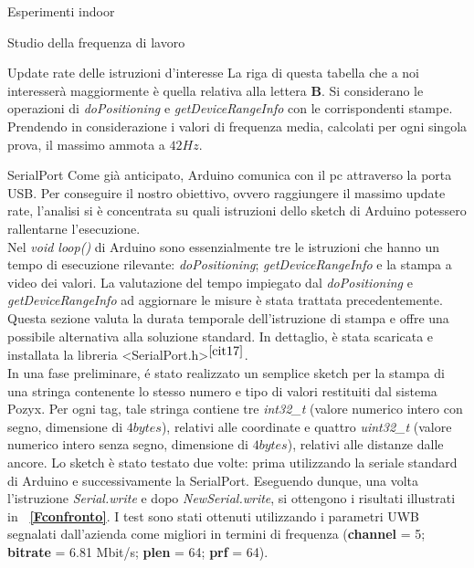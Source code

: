 \documentclass[12pt]{report}
\begin{document}
\begin{section}{Esperimenti indoor}
\begin{subsection}{Studio della frequenza di lavoro}
\begin{subsubsection}{Update rate delle istruzioni d'interesse}
			La riga di questa tabella che a noi interesserà maggiormente è quella relativa alla lettera \textbf{B}. Si considerano le operazioni di \textit{doPositioning} e \textit{getDeviceRangeInfo} con le corrispondenti stampe. Prendendo in considerazione i valori di frequenza media, calcolati per ogni singola prova, il 						massimo ammota a $42Hz$.

		\end{subsubsection}


		\begin{subsubsection}{SerialPort}
			\hypertarget{SS2}{Come} già anticipato, Arduino comunica con il pc attraverso la porta USB. Per conseguire il nostro obiettivo, ovvero raggiungere il massimo update rate, l'analisi si è concentrata su quali istruzioni dello sketch di Arduino potessero rallentarne l’esecuzione.\\ Nel \textit{void loop()} di 								Arduino sono essenzialmente tre le istruzioni che hanno un tempo di esecuzione rilevante: \textit{doPositioning}; \textit{getDeviceRangeInfo} e la stampa a video dei valori. La valutazione del tempo impiegato dal \textit{doPositioning} e \textit{getDeviceRangeInfo} ad aggiornare le misure è stata 									trattata precedentemente.\\ Questa sezione valuta la durata temporale dell’istruzione di stampa e offre una possibile alternativa alla soluzione standard. In dettaglio, è stata scaricata e installata la libreria <SerialPort.h>$^{{\cite{cit17}}}$.\\In una fase preliminare, é stato realizzato un semplice sketch per la 					stampa di una stringa contenente lo stesso numero e tipo di valori restituiti dal sistema Pozyx.  Per ogni tag, tale stringa contiene tre \textit{int32\_t} (valore numerico intero con segno, dimensione di $4bytes$), relativi alle coordinate e 						quattro \textit{uint32\_t} (valore numerico intero senza 						segno, dimensione di $4bytes$), relativi alle distanze dalle ancore. Lo sketch è stato testato due volte: prima utilizzando la seriale standard di Arduino e successivamente la SerialPort. 
			Eseguendo dunque, una volta l’istruzione \textit{Serial.write} e dopo \textit{NewSerial.write}, si ottengono i risultati illustrati in \textbf{\figurename~\ref{Fconfronto}}. I test sono stati ottenuti utilizzando i parametri UWB segnalati dall'azienda come migliori in termini di frequenza (\textbf{channel} = 5; 							\textbf{bitrate} = 6.81 Mbit/s; \textbf{plen} = 64; \textbf{prf} = 64).


\end{subsubsection}
\end{subsection}
\end{section}
\end{document}

